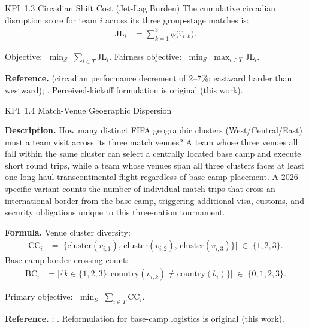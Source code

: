 \documentclass[12pt, letterpaper]{article}
\newcommand{\kpilabel}[1]{\noindent\textbf{#1}\enspace}
\begin{document}
\begin{kpibox}{KPI~1.3 \textendash{} Circadian Shift Cost (Jet-Lag Burden)}
The cumulative circadian disruption score for team $i$ across its three
group-stage matches is:
\begin{align*}
  \mathrm{JL}_i &= \sum_{k=1}^{3} \phi\!\bigl(\hat{\tau}_{i,k}\bigr).
\end{align*}
\vspace{-8pt}

\noindent
Objective: $\;\displaystyle\min_{S}\;\sum_{i \in T}\mathrm{JL}_i$.
\quad
Fairness objective: $\;\displaystyle\min_{S}\;\max_{i \in T}\mathrm{JL}_i$.

\medskip
\kpilabel{Reference.}
\citet{Recht1995} (circadian performance decrement of 2--7\%;
eastward harder than westward); \citet{KendallEtAl2010}.
Perceived-kickoff formulation is original (this work).
\end{kpibox}

\begin{kpibox}{KPI~1.4 \textendash{} Match-Venue Geographic Dispersion}

\kpilabel{Description.}
How many distinct FIFA geographic clusters
(West/Central/East) must a team visit across its three match venues?
A team whose three venues all fall within the same cluster can select a
centrally located base camp and execute short round trips, while a team
whose venues span all three clusters faces at least one long-haul
transcontinental flight regardless of base-camp placement.  A
2026-specific variant counts the number of individual match trips that
cross an international border from the base camp, triggering additional
visa, customs, and security obligations unique to this three-nation
tournament.

\medskip
\kpilabel{Formula.}
Venue cluster diversity:
\begin{align*}
  \mathrm{CC}_i &= \bigl|\bigl\{\mathrm{cluster}(v_{i,1}),\,
    \mathrm{cluster}(v_{i,2}),\,
    \mathrm{cluster}(v_{i,3})\bigr\}\bigr|
  \;\in\;\{1,2,3\}.
\end{align*}
Base-camp border-crossing count:
\begin{align*}
  \mathrm{BC}_i &= \bigl|\bigl\{k \in \{1,2,3\} :
    \mathrm{country}(v_{i,k}) \neq
    \mathrm{country}(b_i)\bigr\}\bigr|
  \;\in\;\{0,1,2,3\}.
\end{align*}
\vspace{-8pt}

\noindent
Primary objective: $\;\displaystyle\min_{S}\;\sum_{i \in T}\mathrm{CC}_i$.

\medskip
\kpilabel{Reference.}
\citet{MikamiTravel2026}; \citet{KendallEtAl2010}.
Reformulation for base-camp logistics is original (this work).
\end{kpibox}
\end{document}
